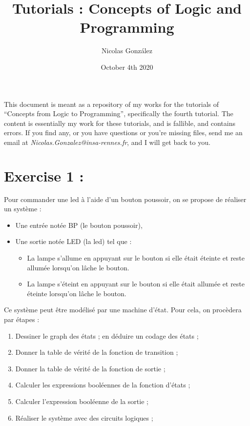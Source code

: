 \documentclass[a4paper,10pt]{article}
\title{Tutorials : Concepts of Logic and Programming}
\author{Nicolas González}
\date{October 4th 2020}
\begin{document}
\maketitle

This document is meant as a repository of my works for the tutorials of ``Concepts from Logic to Programming'', specifically the fourth tutorial. The content is essentially my work for these tutorials, and is fallible, and contains errors. If you find any, or you have questions or you're missing files, send me an email at \textit{Nicolas.Gonzalez@insa-rennes.fr}, and I will get back to you.


\newpage

\section{Exercise 1 :}

Pour commander une led à l'aide d'un bouton poussoir, on se propose de réaliser un système :
\begin{itemize}
	\item Une entrée notée BP (le bouton poussoir),
	\item Une sortie notée LED (la led) tel que :
		\begin{itemize}
			\item La lampe s'allume en appuyant sur le bouton si elle était éteinte et reste allumée lorsqu'on lâche le bouton.
			\item La lampe s'éteint en appuyant sur le bouton si elle était allumée et reste éteinte lorsqu'on lâche le bouton.
		\end{itemize}
\end{itemize}

Ce système peut être modélisé par une machine d'état. Pour cela, on procèdera par étapes :
\begin{enumerate}
	\item Dessiner le graph des états ; en déduire un codage des états ;
	\item Donner la table de vérité de la fonction de transition ;
	\item Donner la table de vérité de la fonction de sortie ;
	\item Calculer les expressions booléennes de la fonction d'états ;
	\item Calculer l'expression booléenne de la sortie ;
	\item Réaliser le système avec des circuits logiques ;
\end{enumerate}
\end{document}
